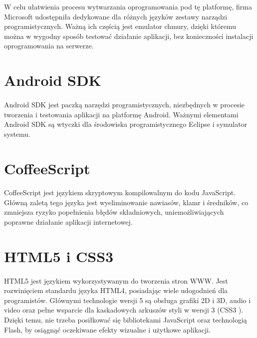 W celu ułatwienia procesu wytwarzania oprogramowania pod tę platformę, firma Microsoft udostępniła dedykowane dla różnych języków zestawy narządzi programistycznych. Ważną ich częścią jest emulator chmury, dzięki któremu można w wygodny sposób testować działanie aplikacji, bez konieczności instalacji oprogramowania na serwerze.

\newpage
\section{Android SDK} %
\label{sec:android_sdk}

\paragraph{} %
\label{par:}

Android SDK \cite{and1} \cite{and2} \cite{android1} \cite{android2} jest paczką narzędzi programistycznych, niezbędnych w procesie tworzenia i testowania aplikacji na platformę Android. Ważnymi elementami Android SDK są wtyczki dla środowiska programistycznego Eclipse i symulator systemu.

\section{CoffeeScript} %
\label{sec:coffeescript}
\paragraph{} %
\label{par:}

CoffeeScript \cite{coffee} jest językiem skryptowym kompilowalnym do kodu JavaScript. Główną zaletą tego języka jest wyeliminowanie nawiasów, klamr i średników, co zmniejsza ryzyko popełnienia błędów składniowych, uniemożliwiających poprawne działanie aplikacji internetowej.

\section{HTML5 i CSS3} %
\label{par:html5_i_css3}
\paragraph{} %
\label{par:}
HTML5 \cite{html5} jest językiem wykorzystywanym do tworzenia stron WWW. Jest rozwinięciem standardu języka HTML4, posiadając wiele udogodnień dla programistów. Głównymi technologie wersji 5 są obsługa grafiki 2D i 3D, audio i video oraz pełne wsparcie dla kaskadowych arkuszów styli w wersji 3 (CSS3 \cite{css3}). Dzięki temu, nie trzeba posiłkować się bibliotekami JavaScript oraz technologią Flash, by osiągnąć oczekiwane efekty wizualne i użytkowe aplikacji.


